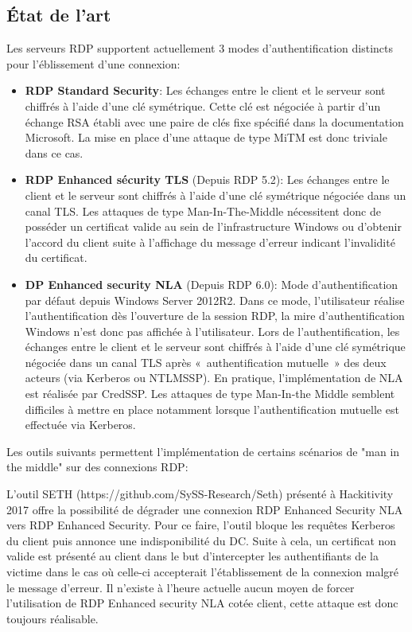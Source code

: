 \subsection{État de l'art}
Les serveurs RDP supportent actuellement 3 modes d'authentification distincts pour l'éblissement d'une connexion:
\begin{itemize}
\item \textbf{RDP Standard Security}: Les échanges entre le client et le serveur sont chiffrés à l'aide d'une clé symétrique. Cette clé est négociée à partir d'un échange RSA établi avec une paire de clés fixe spécifié dans la documentation Microsoft. La mise en place d'une attaque de type MiTM est donc triviale dans ce cas.
\item \textbf{RDP Enhanced sécurity TLS} (Depuis RDP 5.2): Les échanges entre le client et le serveur sont chiffrés à l'aide d'une clé symétrique négociée dans un canal TLS. Les attaques de type Man-In-The-Middle nécessitent donc de posséder un certificat valide au sein de l'infrastructure Windows ou d'obtenir l'accord du client suite à l'affichage du message d'erreur indicant l'invalidité du certificat.  
\item \textbf{DP Enhanced security NLA} (Depuis RDP 6.0): Mode d'authentification par défaut depuis Windows Server 2012R2. Dans ce mode, l'utilisateur réalise l'authentification dès l'ouverture de la session RDP, la mire d'authentification Windows n'est donc pas affichée à l'utilisateur. Lors de l'authentification, les échanges entre le client et le serveur sont chiffrés à l'aide d'une clé symétrique négociée dans un canal TLS après « authentification mutuelle » des deux acteurs (via Kerberos ou NTLMSSP). En pratique, l'implémentation de NLA est réalisée par CredSSP. Les attaques de type Man-In-the Middle semblent difficiles à mettre en place notamment lorsque l’authentification mutuelle est effectuée via Kerberos.
\end{itemize}

Les outils suivants permettent l'implémentation de certains scénarios de "man in the middle" sur des connexions RDP:

L’outil SETH (https://github.com/SySS-Research/Seth) présenté à Hackitivity 2017 offre la possibilité de dégrader une connexion RDP Enhanced Security NLA vers RDP Enhanced Security. Pour ce faire, l’outil bloque les requêtes Kerberos du client puis annonce une indisponibilité du DC. Suite à cela, un certificat non valide est présenté au client dans le but d’intercepter les authentifiants de la victime dans le cas où celle-ci accepterait l’établissement de la connexion malgré le message d'erreur. Il n’existe à l’heure actuelle aucun moyen de forcer l’utilisation de RDP Enhanced security NLA cotée client, cette attaque est donc toujours réalisable.

